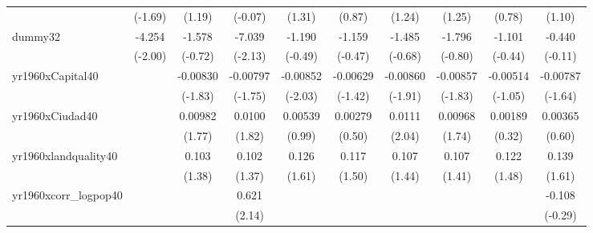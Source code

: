 {\begin{tabular}{l*{9}{c}}
            &     (-1.69)         &      (1.19)         &     (-0.07)         &      (1.31)         &      (0.87)         &      (1.24)         &      (1.25)         &      (0.78)         &      (1.10)         \\
[1em]
dummy32     &      -4.254\sym{*}  &      -1.578         &      -7.039\sym{*}  &      -1.190         &      -1.159         &      -1.485         &      -1.796         &      -1.101         &      -0.440         \\
            &     (-2.00)         &     (-0.72)         &     (-2.13)         &     (-0.49)         &     (-0.47)         &     (-0.68)         &     (-0.80)         &     (-0.44)         &     (-0.11)         \\
[1em]
yr1960xCapital40&                     &    -0.00830         &    -0.00797         &    -0.00852\sym{*}  &    -0.00629         &    -0.00860         &    -0.00857         &    -0.00514         &    -0.00787         \\
            &                     &     (-1.83)         &     (-1.75)         &     (-2.03)         &     (-1.42)         &     (-1.91)         &     (-1.83)         &     (-1.05)         &     (-1.64)         \\
[1em]
yr1960xCiudad40&                     &     0.00982         &      0.0100         &     0.00539         &     0.00279         &      0.0111\sym{*}  &     0.00968         &     0.00189         &     0.00365         \\
            &                     &      (1.77)         &      (1.82)         &      (0.99)         &      (0.50)         &      (2.04)         &      (1.74)         &      (0.32)         &      (0.60)         \\
[1em]
yr1960xlandquality40&                     &       0.103         &       0.102         &       0.126         &       0.117         &       0.107         &       0.107         &       0.122         &       0.139         \\
            &                     &      (1.38)         &      (1.37)         &      (1.61)         &      (1.50)         &      (1.44)         &      (1.41)         &      (1.48)         &      (1.61)         \\
[1em]
yr1960xcorr\_logpop40&                     &                     &       0.621\sym{*}  &                     &                     &                     &                     &                     &      -0.108         \\
            &                     &                     &      (2.14)         &                     &                     &                     &                     &                     &     (-0.29)         \\

\end{tabular}}
